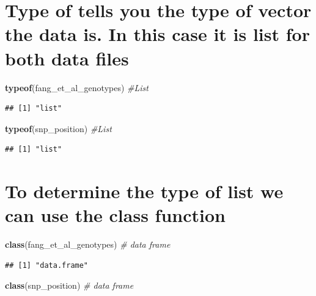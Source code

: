 \documentclass[
]{article}
\newenvironment{Shaded}{\begin{snugshade}}{\end{snugshade}}
\newcommand{\CommentTok}[1]{\textcolor[rgb]{0.56,0.35,0.01}{\textit{#1}}}
\newcommand{\FunctionTok}[1]{\textcolor[rgb]{0.13,0.29,0.53}{\textbf{#1}}}
\newcommand{\NormalTok}[1]{#1}
\begin{document}
\section{Type of tells you the type of vector the data is. In this case
it is list for both data
files}\label{type-of-tells-you-the-type-of-vector-the-data-is.-in-this-case-it-is-list-for-both-data-files}

\begin{Shaded}
\begin{Highlighting}[]
\FunctionTok{typeof}\NormalTok{(fang\_et\_al\_genotypes) }\CommentTok{\#List}
\end{Highlighting}
\end{Shaded}

\begin{verbatim}
## [1] "list"
\end{verbatim}

\begin{Shaded}
\begin{Highlighting}[]
\FunctionTok{typeof}\NormalTok{(snp\_position) }\CommentTok{\#List}
\end{Highlighting}
\end{Shaded}

\begin{verbatim}
## [1] "list"
\end{verbatim}

\section{To determine the type of list we can use the class
function}\label{to-determine-the-type-of-list-we-can-use-the-class-function}

\begin{Shaded}
\begin{Highlighting}[]
\FunctionTok{class}\NormalTok{(fang\_et\_al\_genotypes) }\CommentTok{\# data frame}
\end{Highlighting}
\end{Shaded}

\begin{verbatim}
## [1] "data.frame"
\end{verbatim}

\begin{Shaded}
\begin{Highlighting}[]
\FunctionTok{class}\NormalTok{(snp\_position) }\CommentTok{\# data frame}
\end{Highlighting}
\end{Shaded}
\end{document}
